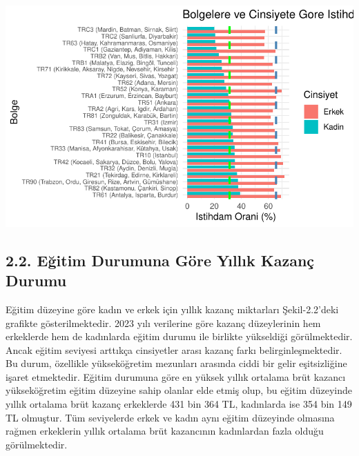\documentclass[
  11pt,
  a4paper,
  DIV=11,
  numbers=noendperiod]{scrartcl}
\begin{document}
\includegraphics{project_files/figure-pdf/unnamed-chunk-2-1.pdf}

\subsection{2.2. Eğitim Durumuna Göre Yıllık Kazanç
Durumu}\label{eux11fitim-durumuna-guxf6re-yux131llux131k-kazanuxe7-durumu}

Eğitim düzeyine göre kadın ve erkek için yıllık kazanç miktarları
Şekil-2.2'deki grafikte gösterilmektedir. 2023 yılı verilerine göre
kazanç düzeylerinin hem erkeklerde hem de kadınlarda eğitim durumu ile
birlikte yükseldiği görülmektedir. Ancak eğitim seviyesi arttıkça
cinsiyetler arası kazanç farkı belirginleşmektedir. Bu durum, özellikle
yükseköğretim mezunları arasında ciddi bir gelir eşitsizliğine işaret
etmektedir. Eğitim durumuna göre en yüksek yıllık ortalama brüt kazancı
yükseköğretim eğitim düzeyine sahip olanlar elde etmiş olup, bu eğitim
düzeyinde yıllık ortalama brüt kazanç erkeklerde 431 bin 364 TL,
kadınlarda ise 354 bin 149 TL olmuştur. Tüm seviyelerde erkek ve kadın
aynı eğitim düzeyinde olmasına rağmen erkeklerin yıllık ortalama brüt
kazancının kadınlardan fazla olduğu görülmektedir.
\end{document}
